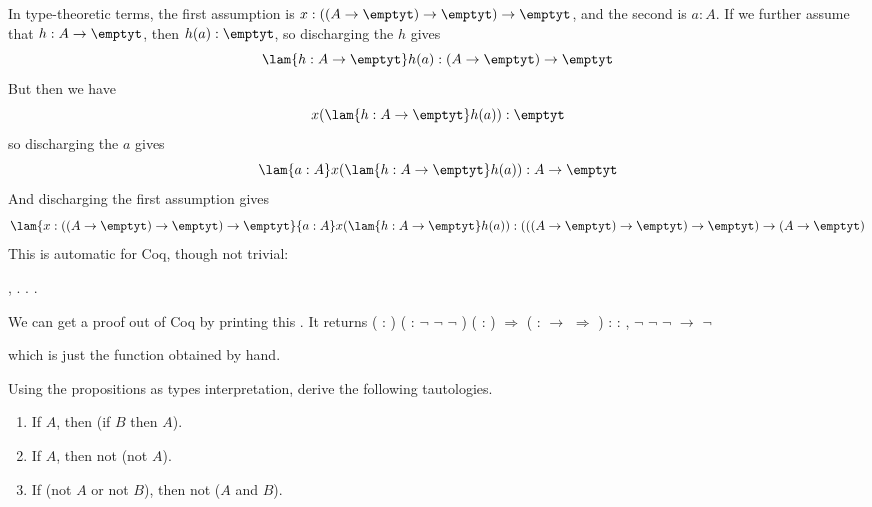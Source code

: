 In type-theoretic terms, the first assumption is $x : ((A \to \emptyt) \to
\emptyt) \to \emptyt$, and the second is $a : A$.  If we further assume that
$h : A \to \emptyt$, then $h(a) : \emptyt$, so discharging the $h$ gives
\[
  \lam{h:A \to \emptyt}h(a) : (A \to \emptyt) \to \emptyt
\]
But then we have
\[
  x(\lam{h : A \to \emptyt}h(a)) : \emptyt
\]
so discharging the $a$ gives
\[
  \lam{a:A}x(\lam{h : A \to \emptyt}h(a)) : A \to \emptyt
\]
And discharging the first assumption gives
\[
  \lam{x:((A\to\emptyt)\to\emptyt)\to\emptyt}{a:A}x(\lam{h : A \to
    \emptyt}h(a)) :
  (((A \to \emptyt) \to \emptyt) \to \emptyt) \to (A \to \emptyt)
\]
This is automatic for Coq, though not trivial: \begin{coqdoccode}
\coqdocemptyline
\coqdocnoindent
{} \coqdockw{\ensuremath{\forall}} , \coqdocnotation{\ensuremath{\lnot}} \coqdocnotation{\ensuremath{\lnot}} \coqdocnotation{\ensuremath{\lnot}}   \coqdocnotation{\ensuremath{\lnot}}. . .\coqdoceol
\coqdocemptyline
\end{coqdoccode}


\noindent 
We can get a proof out of Coq by printing this .  It returns
\coqdoceol
\coqdocemptyline
\coqdocnoindent
{} ( : ) ( : \ensuremath{\lnot} \ensuremath{\lnot} \ensuremath{\lnot} ) ( : ) \ensuremath{\Rightarrow}  (  :  \ensuremath{\rightarrow}  \ensuremath{\Rightarrow}  ) \coqdoceol
\coqdocindent{2.00em}
: \coqdockw{\ensuremath{\forall}}  : , \ensuremath{\lnot} \ensuremath{\lnot} \ensuremath{\lnot}  \ensuremath{\rightarrow} \ensuremath{\lnot} 

\coqdocemptyline
\noindent
which is just the function obtained by hand. 

Using the propositions as types interpretation, derive the
following tautologies.
\begin{enumerate}
\item If $A$, then (if $B$ then $A$).
\item If $A$, then not (not $A$).
\item If (not $A$ or not $B$), then not ($A$ and $B$).
\end{enumerate} \begin{coqdoccode}
\coqdocemptyline
\end{coqdoccode}


